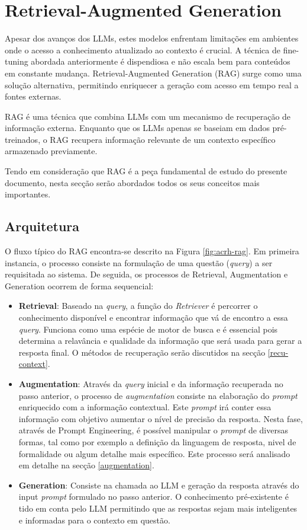 \section{Retrieval-Augmented Generation}

Apesar dos avanços dos LLMs, estes modelos enfrentam limitações em ambientes onde o acesso a conhecimento atualizado ao contexto é crucial. A técnica de fine-tuning abordada anteriormente é dispendiosa e não escala bem para conteúdos em constante mudança. Retrieval-Augmented Generation (RAG) surge como uma solução alternativa, permitindo enriquecer a geração com acesso em tempo real a fontes externas.

RAG é uma técnica que combina LLMs com um mecanismo de recuperação de informação externa. Enquanto que os LLMs apenas se baseiam em dados pré-treinados, o RAG recupera informação relevante de um contexto específico armazenado previamente.

Tendo em consideração que RAG é a peça fundamental de estudo do presente documento, nesta secção serão abordados todos os seus conceitos mais importantes.

\subsection{Arquitetura}


O fluxo típico do RAG encontra-se descrito na Figura \ref{fig:acrh-rag}. Em primeira instancia, o processo consiste na formulação de uma questão (\textit{query}) a ser requisitada ao sistema. De seguida, os processos de  Retrieval, Augmentation e Generation ocorrem de forma sequencial: 


\begin{itemize}
    \item \textbf{Retrieval}: Baseado na \textit{query}, a função do \textit{Retriever} é percorrer o conhecimento disponível e encontrar informação que vá de encontro a essa \textit{query}. Funciona como uma espécie de motor de busca e é essencial pois determina a relavância e qualidade da informação que será usada para gerar a resposta final. O métodos de recuperação serão discutidos na secção \ref{recu-context}.
    \item \textbf{Augmentation}: Através da \textit{query} inicial e da informação recuperada no passo anterior, o processo de \textit{augmentation} consiste na elaboração do \textit{prompt} enriquecido com a informação contextual. Este \textit{prompt} irá conter essa informação com objetivo aumentar o nível de precisão da resposta. Nesta fase, através de Prompt Engineering, é possível manipular o \textit{prompt} de diversas formas, tal como por exemplo a definição da linguagem de resposta, nivel de formalidade ou algum detalhe mais específico. Este processo será analisado em detalhe na secção \ref{augmentation}.
    \item \textbf{Generation}: Consiste na chamada ao LLM e geração da resposta através do input \textit{prompt} formulado no passo anterior. O conhecimento pré-existente é tido em conta pelo LLM permitindo que as respostas sejam mais inteligentes e informadas para o contexto em questão. 
\end{itemize}



